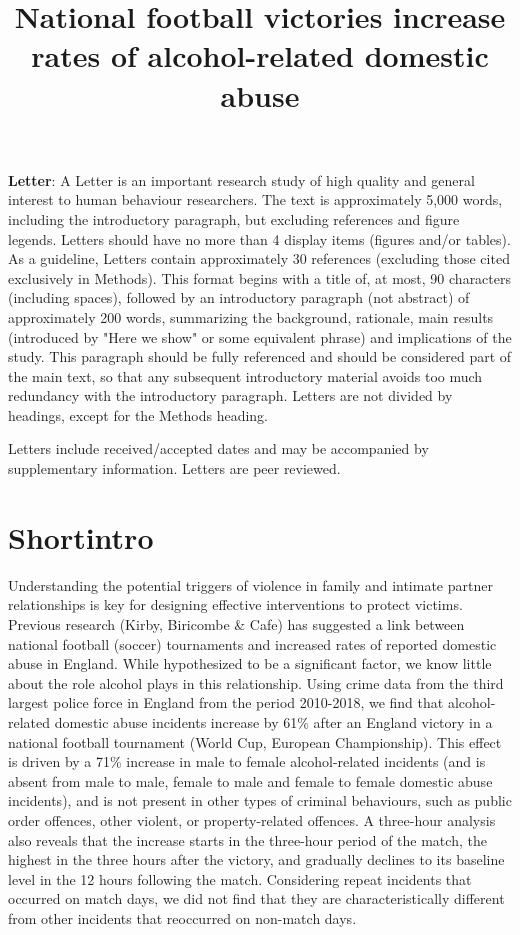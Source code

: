 \documentclass[12pt, letterpaper]{article}
\begin{document}
\title{National football victories increase rates of alcohol-related domestic abuse}
\textbf{Letter}:
A Letter is an important research study of high quality and general interest to human behaviour researchers.  The text is approximately 5,000 words, including the introductory paragraph, but excluding references and figure legends. Letters should have no more than 4 display items (figures and/or tables). As a guideline, Letters contain approximately 30 references (excluding those cited exclusively in Methods). This format begins with a title of, at most, 90 characters (including spaces), followed by an introductory paragraph (not abstract) of approximately 200 words, summarizing the background, rationale, main results (introduced by "Here we show" or some equivalent phrase) and implications of the study. This paragraph should be fully referenced and should be considered part of the main text, so that any subsequent introductory material avoids too much redundancy with the introductory paragraph. Letters are not divided by headings, except for the Methods heading.

Letters include received/accepted dates and may be accompanied by supplementary information. Letters are peer reviewed.


\maketitle

\section{Shortintro}

Understanding the potential triggers of violence in family and intimate partner relationships is key for designing effective interventions to protect victims. Previous research (Kirby, Biricombe \& Cafe) has suggested a link between national football (soccer) tournaments and increased rates of reported domestic abuse in England. While hypothesized to be a significant factor, we know little about the role alcohol plays in this relationship. Using crime data from the third largest police force in England from the period 2010-2018, we find that alcohol-related domestic abuse incidents increase by 61\% after an England victory in a national football tournament (World Cup, European Championship). This effect is driven by a 71\% increase in male to female alcohol-related incidents (and is absent from male to male, female to male and female to female domestic abuse incidents), and is not present in other types of criminal behaviours, such as public order offences, other violent, or property-related offences. A three-hour analysis also reveals that the increase starts in the three-hour period of the match, the highest in the three hours after the victory, and gradually declines to its baseline level in the 12 hours following the match. Considering repeat incidents that occurred on match days, we did not find that they are characteristically different from other incidents that reoccurred on non-match days.
\end{document}
